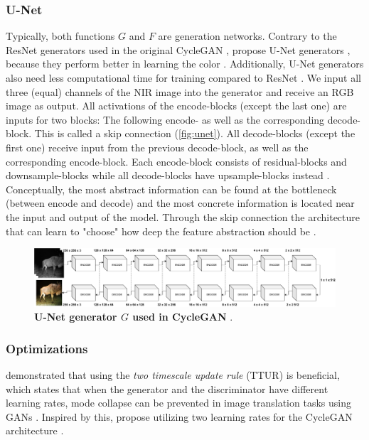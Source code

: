 \subsubsection*{U-Net}
\label{sec:cycle-gan-u-net}
Typically, both functions $G$ and $F$ are generation networks. Contrary to the ResNet generators \parencite{resnet} \citeauthor{cyclegan-original} used in the original CycleGAN \parencite{cyclegan-original},
\citeauthor*{mehri} propose U-Net generators \parencite{unet}, because they perform better in learning the color \parencite{mehri}.
Additionally, U-Net generators also need less computational time for training compared to ResNet \parencite{mehri}.
We input all three (equal) channels of the NIR image into the generator and receive an RGB image as output.
All activations of the encode-blocks (except the last one) are inputs for two blocks:
The following encode- as well as the corresponding decode-block. This is called a skip connection \parencite{unet} (\autoref{fig:unet}). 
All decode-blocks (except the first one) receive input from the previous decode-block, as well as the corresponding encode-block.
Each encode-block consists of residual-blocks and downsample-blocks while all decode-blocks have upsample-blocks instead \parencite{unet}. 
Conceptually, the most abstract information can be found at the bottleneck (between encode and decode) and the most concrete information is located near the input and output of the model.
Through the skip connection the architecture that can learn to "choose" how deep the feature abstraction should be \parencite{unet}.

\begin{figure}[h]
   \includegraphics[width=\textwidth]{gfx/CycleGAN-Unet.pdf}
   \caption{
      \textbf{U-Net generator $G$ used in CycleGAN} \parencite{unet,mehri}.
   }
   \label{fig:unet}
\end{figure}

\subsubsection*{Optimizations}
\Textcite{ttur} demonstrated that using the \textit{two timescale update rule} (TTUR) is beneficial, which states that when the generator and the discriminator have different learning rates,
mode collapse can be prevented in image translation tasks using GANs \parencite{mehri}.
Inspired by this, \citeauthor*{mehri} propose utilizing two learning rates for the CycleGAN architecture \parencite{mehri}.


